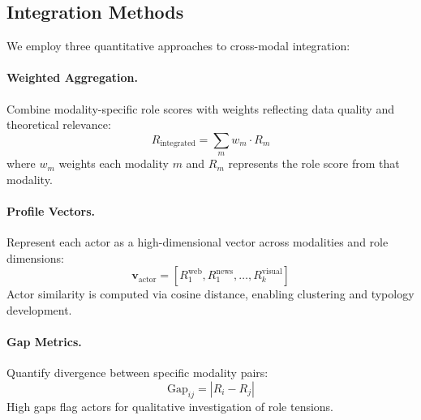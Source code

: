 \documentclass[../main.tex]{subfiles}
\begin{document}
\subsection{Integration Methods}

We employ three quantitative approaches to cross-modal integration:

\paragraph{Weighted Aggregation.} Combine modality-specific role scores with weights reflecting data quality and theoretical relevance:
$$R_{\text{integrated}} = \sum_{m} w_m \cdot R_m$$
where $w_m$ weights each modality $m$ and $R_m$ represents the role score from that modality.

\paragraph{Profile Vectors.} Represent each actor as a high-dimensional vector across modalities and role dimensions:
$$\mathbf{v}_{\text{actor}} = [R_1^{\text{web}}, R_1^{\text{news}}, \ldots, R_k^{\text{visual}}]$$
Actor similarity is computed via cosine distance, enabling clustering and typology development.

\paragraph{Gap Metrics.} Quantify divergence between specific modality pairs:
$$\text{Gap}_{ij} = |R_i - R_j|$$
High gaps flag actors for qualitative investigation of role tensions.
\end{document}
